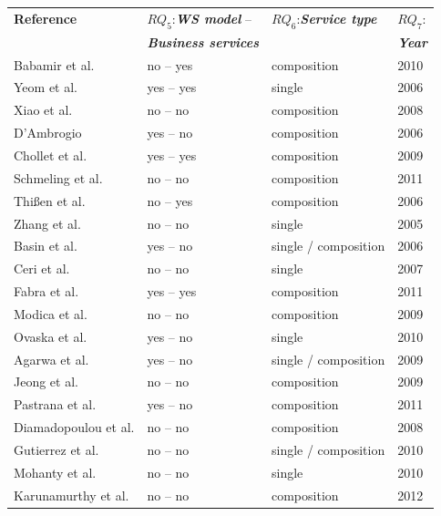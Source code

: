 \documentclass{sig-alternate}
\begin{document}
 
\begin{table}[ht!]
\centering
\tiny
\begin{tabular}{l|l|l|l}
  \hline 
  \hline
   \textbf{Reference} & $RQ_5$:\textbf{\textit{WS model}} --
   & $RQ_6$:\textbf{\textit{Service type}}  &
   $RQ_7$: 
   \\
    &   \textbf{\textit{Business services}} &   & \textbf{\textit{Year}}
   \\
  \hline
  \hline  
  Babamir et al. \cite{Babamir2010} & no -- yes  & composition & 2010   
 \\  
  \hline   
  Yeom et al. \cite{Yeom2006} & yes -- yes & single   & 2006  \\  \hline
  Xiao et al. \cite{XiaoCZBOLH08} & no -- no & composition    & 2008
   \\ 
  \hline 
  D'Ambrogio \cite{DAmbrogio06} & yes  -- no & composition  & 2006 \\
   \hline
  Chollet et al. \cite{CholletL09} & yes -- yes & composition  &  2009 \\
  \hline 
  Schmeling et al. \cite{SchmelingCM11} & no -- no & composition &  2011 \\ 
  \hline
   Thi{\ss}en et al. \cite{ThissenW06} & no -- yes & composition & 2006
   \\
  \hline
  Zhang et al. \cite{ZhangPSP05} & no -- no  & single  & 2005 \\ 
  \hline
  Basin et al. \cite{BasinDL06} & yes -- no & single / composition  & 
  2006\\
  \hline 
  Ceri et al. \cite{CeriDMF07} & no -- no  & single  &  2007\\ 
  \hline 
  Fabra et al. \cite{Fabra2011} & yes -- yes & composition  &  2011\\
  \hline
  Modica et al. \cite{ModicaTV09} & no -- no & composition & 2009\\ 
  \hline
  Ovaska et al. \cite{OvaskaEHPA10} & yes -- no & single & 2010\\
  \hline
  Agarwa et al. \cite{AgarwalLS09} & yes -- no & single / composition  &  
  2009\\
  \hline
  Jeong et al. \cite{JeongCL09} & no -- no  & composition &  2009\\
  \hline
  Pastrana et al. \cite{PastranaPK11} & yes -- no & composition &  2011 \\
  \hline
  Diamadopoulou et al. \cite{DiamadopoulouMPS08} & no -- no & composition 
  & 2008\\
  \hline
  Gutierrez et al. \cite{GutierrezRF10} & no -- no &  single / composition 
  & 2010\\
  \hline
  Mohanty et al. \cite{MohantyRP10} & no -- no  & single  & 2010\\
  \hline
   Karunamurthy et al. \cite{Karunamurthy2012787}& no -- no  & composition  &
   2012\\
  

\end{tabular}
\end{table}
\end{document}
